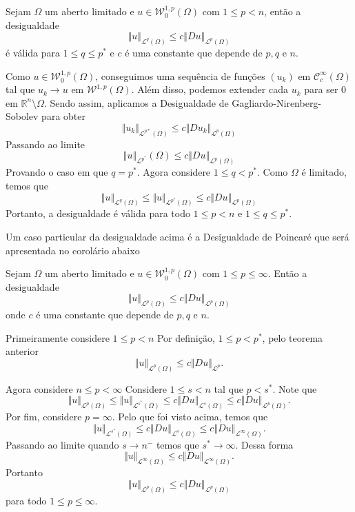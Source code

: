 \documentclass[a4paper, 11pt]{book}
\theoremstyle{definition}
\newcommand{\bR}{\mathbb{R}}
\newcommand{\cC}{\mathcal{C}}
\newcommand{\cL}{\mathcal{L}}
\newcommand{\cW}{\mathcal{W}}
\begin{document}
\begin{tbox}
    Sejam $\Omega$ um aberto limitado e $u \in \cW^{1,p}_0(\Omega)$ com $1 \leqslant p < n$, então a desigualdade
    \[
        \Vert u \Vert_{\cL^q(\Omega)} \leqslant c \Vert Du \Vert_{\cL^p(\Omega)}
    \]
    é válida para $1 \leqslant q \leqslant p^*$ e $c$ é uma constante que depende de $p, q$ e $n$.
\end{tbox}
\begin{prf}
    Como $u \in \cW^{1,p}_0(\Omega)$, conseguimos uma sequência de funções $(u_k)$ em $\cC^{\infty}_c(\Omega)$ tal que $u_k \to u$ em $\cW^{1,p}(\Omega)$.
    Além disso, podemos extender cada $u_k$ para ser $0$ em $\bR^n \setminus \Omega$.
    Sendo assim, aplicamos a Desigualdade de Gagliardo-Nirenberg-Sobolev para obter
    \[
        \Vert u_k \Vert_{\cL^{p*}(\Omega)} \leqslant c \Vert Du_k \Vert_{\cL^p(\Omega)}
    \]
    Passando ao limite
    \[
        \Vert u \Vert_{\cL^{p^*}}(\Omega) \leqslant c \Vert Du \Vert_{\cL^p(\Omega)}
    \]
    Provando o caso em que $q = p^*$. Agora considere $1 \leqslant q < p^*$.
    Como $\Omega$ é limitado, temos que
    \[
        \Vert u \Vert_{\cL^q(\Omega)} \leqslant \Vert u \Vert_{\cL^{p^*}(\Omega)} \leqslant c \Vert Du \Vert_{\cL^p(\Omega)}
    \]
    Portanto, a desigualdade é válida para todo $1 \leqslant p < n$ e $1 \leqslant q \leqslant p^*$.
\end{prf}

Um caso particular da desigualdade acima é a Desigualdade de Poincaré que será apresentada no corolário abaixo

\begin{cbox}
   Sejam $\Omega$ um aberto limitado e $u \in \cW^{1,p}_0(\Omega)$ com $1 \leqslant p \leqslant \infty$. Então a desigualdade
   \[
        \Vert u \Vert_{\cL^p(\Omega)} \leqslant c\Vert Du \Vert_{\cL^p(\Omega)}
   \]
   onde $c$ é uma constante que depende de $p, q$ e $n$.
\end{cbox}
\begin{prf}
    Primeiramente considere $1 \leqslant p < n$
    Por definição, $1 \leqslant p < p^*$, pelo teorema anterior
    \[
        \Vert u \Vert_{\cL^p(\Omega)} \leqslant c \Vert Du \Vert_{\cL^p}.
    \]

    Agora considere $n \leqslant p < \infty$
    Considere $1 \leqslant s < n$ tal que $p < s^*$.
    Note que
    \[
        \Vert u \Vert_{\cL^p(\Omega)} \leqslant \Vert u \Vert_{\cL^{s^*}(\Omega)} \leqslant c \Vert Du \Vert_{\cL^s(\Omega)} \leqslant c \Vert Du \Vert_{\cL^p(\Omega)}.
    \]
    Por fim, considere $p = \infty$.
    Pelo que foi visto acima, temos que
    \[
        \Vert u \Vert_{\cL^{s^*}(\Omega)} \leqslant c \Vert Du \Vert_{\cL^{s}(\Omega)} \leqslant c \Vert Du \Vert_{\cL^\infty(\Omega)}.
    \]
    Passando ao limite quando $s \to n^-$ temos que $s^* \to \infty$. Dessa forma
    \[
        \Vert u \Vert_{\cL^\infty(\Omega)} \leqslant c \Vert Du \Vert_{\cL^\infty(\Omega)}.
    \]
    Portanto
    \[
        \Vert u \Vert_{\cL^p(\Omega)} \leqslant c\Vert Du \Vert_{\cL^p(\Omega)}
    \]
    para todo $1 \leqslant p \leqslant \infty$.
\end{prf}
\end{document}
